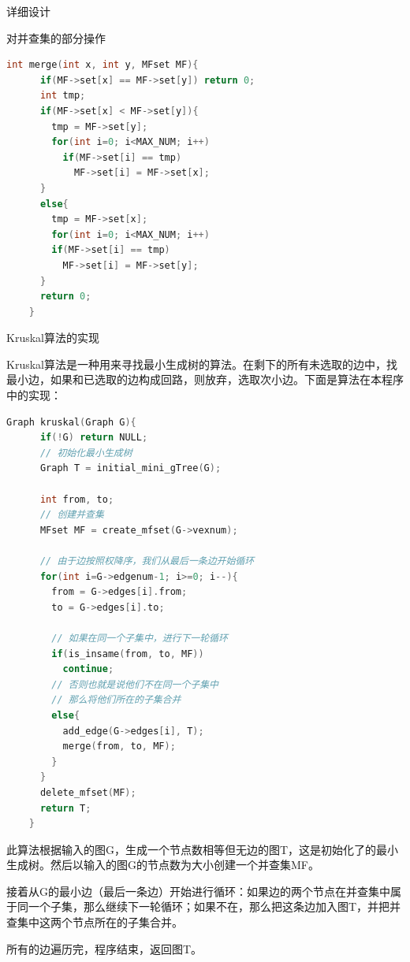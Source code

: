\documentclass[UTF8]{ctexart}
\begin{document}
\begin{section}{详细设计}
\begin{subsection}{对并查集的部分操作}

\begin{mdframed}[everyline=true]
\begin{lstlisting}[language=c]
    int merge(int x, int y, MFset MF){
      if(MF->set[x] == MF->set[y]) return 0;
      int tmp;
      if(MF->set[x] < MF->set[y]){
        tmp = MF->set[y];
        for(int i=0; i<MAX_NUM; i++)
          if(MF->set[i] == tmp)
            MF->set[i] = MF->set[x];
      }
      else{
        tmp = MF->set[x];
        for(int i=0; i<MAX_NUM; i++)
        if(MF->set[i] == tmp)
          MF->set[i] = MF->set[y];
      }
      return 0;
    }
\end{lstlisting}
\end{mdframed}

\end{subsection}


\begin{subsection}{Kruskal算法的实现}
\par{Kruskal算法是一种用来寻找最小生成树的算法。在剩下的所有未选取的边中，找最小边，如果和已选取的边构成回路，则放弃，选取次小边。下面是算法在本程序中的实现：\\}

\begin{mdframed}[everyline=true]
\begin{lstlisting}[language=c]
    Graph kruskal(Graph G){
      if(!G) return NULL;
      // 初始化最小生成树
      Graph T = initial_mini_gTree(G);

      int from, to;
      // 创建并查集
      MFset MF = create_mfset(G->vexnum);

      // 由于边按照权降序，我们从最后一条边开始循环
      for(int i=G->edgenum-1; i>=0; i--){
        from = G->edges[i].from;
        to = G->edges[i].to;

        // 如果在同一个子集中，进行下一轮循环
        if(is_insame(from, to, MF))
          continue;
        // 否则也就是说他们不在同一个子集中
        // 那么将他们所在的子集合并
        else{
          add_edge(G->edges[i], T);
          merge(from, to, MF);
        }
      }
      delete_mfset(MF);
      return T;
    }
\end{lstlisting}
\end{mdframed}

\par{此算法根据输入的图G，生成一个节点数相等但无边的图T，这是初始化了的最小生成树。然后以输入的图G的节点数为大小创建一个并查集MF。}
\par{接着从G的最小边（最后一条边）开始进行循环：如果边的两个节点在并查集中属于同一个子集，那么继续下一轮循环；如果不在，那么把这条边加入图T，并把并查集中这两个节点所在的子集合并。}
\par{所有的边遍历完，程序结束，返回图T。\\}


\end{subsection}
\end{section}
\end{document}
